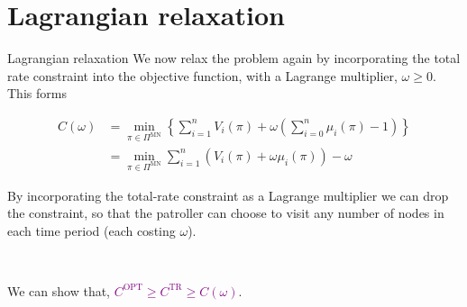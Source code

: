 \documentclass[10pt]{beamer}
\begin{document}
\section{Lagrangian relaxation}
\begin{frame}{Lagrangian relaxation}
We now relax the problem again by incorporating the total rate constraint into the objective function, with a Lagrange multiplier, $\omega \geq 0$. This forms

\begin{align*}
C(\omega)&=\min_{\pi \in \Pi^{\text{MN}}} \left\{ \sum\limits_{i=1}^{n} V_{i}(\pi) + \omega \left( \sum\limits_{i=0}^{n} \mu_{i}(\pi) -1 \right) \right\} \\
&=\min_{\pi \in \Pi^{\text{MN}}} \sum\limits_{i=1}^{n} (V_{i}(\pi)+\omega \mu_{i}(\pi)) - \omega
\end{align*}

By incorporating the total-rate constraint as a Lagrange multiplier we can drop the constraint, so that the patroller can choose to visit any number of nodes in each time period (each costing $\omega$).

\
\pause

We can show that, \textcolor{purple}{$C^{\text{OPT}} \geq C^{\text{TR}} \geq C(\omega)$}.
\end{frame}

%
%
%
%
\end{document}
